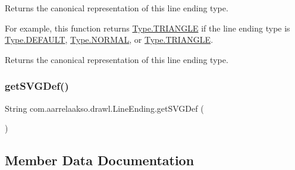 Returns the canonical representation of this line ending type. 

For example, this function returns \hyperlink{enumcom_1_1aarrelaakso_1_1drawl_1_1_line_ending_1_1_type_a175880412926b2126d70c22ae7396009}{Type.\+T\+R\+I\+A\+N\+G\+LE} if the line ending type is \hyperlink{enumcom_1_1aarrelaakso_1_1drawl_1_1_line_ending_1_1_type_a60839eb2ed0486a6f9f987c64d27e313}{Type.\+D\+E\+F\+A\+U\+LT}, \hyperlink{enumcom_1_1aarrelaakso_1_1drawl_1_1_line_ending_1_1_type_a1f96f154af5043259b200495ec8b2af6}{Type.\+N\+O\+R\+M\+AL}, or \hyperlink{enumcom_1_1aarrelaakso_1_1drawl_1_1_line_ending_1_1_type_a175880412926b2126d70c22ae7396009}{Type.\+T\+R\+I\+A\+N\+G\+LE}.

\begin{DoxyReturn}{Returns}
the canonical representation of this line ending type. 
\end{DoxyReturn}
\mbox{\label{classcom_1_1aarrelaakso_1_1drawl_1_1_line_ending_a30fe25c0bc92fe34abffcd1b16248605}} 
\subsubsection{\texorpdfstring{get\+S\+V\+G\+Def()}{getSVGDef()}}
{\footnotesize\ttfamily String com.\+aarrelaakso.\+drawl.\+Line\+Ending.\+get\+S\+V\+G\+Def (\begin{DoxyParamCaption}{ }\end{DoxyParamCaption})\hspace{0.3cm}{\ttfamily [protected]}}



\subsection{Member Data Documentation}
\mbox{\label{classcom_1_1aarrelaakso_1_1drawl_1_1_line_ending_a0f407b000ff81f764af791028e8e34b6}} 
